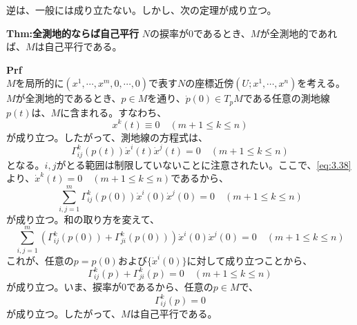 \documentclass[a4paper,11pt]{jsarticle}
\numberwithin{equation}{section}
\begin{document}
逆は、一般には成り立たない。しかし、次の定理が成り立つ。
\begin{itembox}[l]{\textbf{Thm:全測地的ならば自己平行}}
    $N$の捩率が0であるとき、$M$が全測地的であれば、$M$は自己平行である。
\end{itembox}
\textbf{Prf}\\
$M$を局所的に$(x^1,\cdots,x^m,0,\cdots,0)$で表す$N$の座標近傍$(U;x^1,\cdots,x^n)$を考える。$M$が全測地的であるとき、$p \in M$を通り、$\dot{p}(0) \in T_pM$である任意の測地線$p(t)$は、$M$に含まれる。すなわち、
\begin{equation}
    \label{eq:3.38}
    x^k(t) \equiv 0 \quad (m+1 \leq k \leq n)
\end{equation}
が成り立つ。したがって、測地線の方程式は、
\begin{equation}
    \Gamma_{ij}^k(p(t))\dot{x}^i(t)\dot{x}^j(t) = 0 \quad (m+1 \leq k \leq n)
\end{equation}
となる。$i,j$がとる範囲は制限していないことに注意されたい。ここで、\ref{eq:3.38}より、$\dot{x}^k(t) = 0 \quad (m+1 \leq k \leq n)$であるから、
\begin{equation}
    \sum_{i,j=1}^{m} \Gamma_{ij}^k(p(0))\dot{x}^i(0)\dot{x}^j(0) = 0 \quad (m+1 \leq k \leq n)
\end{equation}
が成り立つ。和の取り方を変えて、
\begin{equation}
    \sum_{i,j=1}^{m} (\Gamma_{ij}^k(p(0)) + \Gamma_{ji}^k(p(0)))\dot{x}^i(0)\dot{x}^j(0) = 0 \quad (m+1 \leq k \leq n)
\end{equation}
これが、任意の$p=p(0)$および$\{\dot{x}^i(0)\}$に対して成り立つことから、
\begin{equation}
    \Gamma_{ij}^k(p) + \Gamma_{ji}^k(p) = 0 \quad (m+1 \leq k \leq n)
\end{equation}
が成り立つ。いま、捩率が0であるから、任意の$p \in M$で、
\begin{equation}
    \Gamma_{ij}^k(p) = 0
\end{equation}
が成り立つ。したがって、$M$は自己平行である。\hfill\qedsymbol
\end{document}
